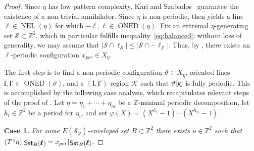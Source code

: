 \documentclass[12pt]{amsart}
\numberwithin{equation}{section}
\DeclareMathOperator{\nexpl}{NEL}
\DeclareMathOperator{\nexpd}{ONED}
\DeclareMathOperator{\sst}{\mathsf{Sst}}
\newcommand{\bb}[1]{\mathbb{#1}}
\newcommand{\sob}[1]{\ensuremath{{\mathbin |}\raise-.4ex\hbox{$#1$}}}
\begin{document}
\begin{proof}
Since $\eta$ has low pattern complexity, Kari and Szabados~\cite{KariSzabados20} guarantee the existence of a non-trivial annihilator. Since $\eta$ is non-periodic, \cite[Theorem~1.9]{Colle23} then yields a line $\ell \in \nexpl(\eta)$ for which $-\pmb{\ell},\pmb{\ell} \in \nexpd(\eta)$. Fix an extremal $\eta$-generating set $\mathcal{S} \subset \bb{Z}^2$, which in particular fulfills inequality~\eqref{eq:balanced}; without loss of generality, we may assume that \(|\mathcal{S} \cap \pmb{\ell}_{\mathcal{S}}| \leq |\mathcal{S} \cap -\pmb{\ell}_{\mathcal{S}}|\). Thus, by \cite[Propositions~2.13 and~2.14]{Colle23}, there exists an $\ell$-periodic configuration $x_{per} \in X_\eta$.
 
The first step is to find a non-periodic configuration $\vartheta \in X_\eta$, oriented lines $\pmb{l}, \pmb{l}' \in \nexpd(\vartheta)$, and a $(\pmb{l},\pmb{l}')$-region $\mathcal{K} $ such that $\vartheta\sob{\mathcal{K}}$ is fully periodic. This is accomplished by the following case analysis, which recapitulates relevant steps of the proof of \cite[Lemma~4.6]{Colle23}. Let \(\eta = \eta_1+\cdots+\eta_m\) be a \(\bb{Z}\)-minimal periodic decomposition, let \(h_i \in \bb{Z}^2\) be a period for \(\eta_i\), and set $\varphi(X) = (X^{h_1}-1) \cdots (X^{h_m}-1)$. 

\medskip\noindent
\textbf{Case 1.} \textit{For some \(E(\mathcal{S}_{\varphi})\)-enveloped set \(B \subset \bb{Z}^2\) there exists $u \in \bb{Z}^2$ such that $(T^{u}\eta)\sob{\sst_B(\pmb{\ell})} = x_{per}\sob{\sst_B(\pmb{\ell})}$.}

\medskip


\end{proof}
\end{document}
